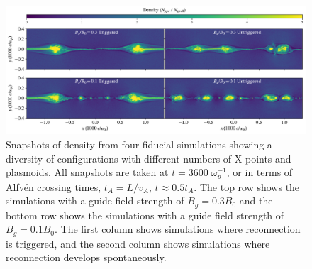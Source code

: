 \begin{figure}[t]
	\includegraphics[width=\linewidth]{2x2_flds_reord.pdf}
	\caption{Snapshots of density from four fiducial simulations showing a diversity of configurations with different numbers of X-points and plasmoids.  All snapshots are taken at $t=3600 \; \omega_{p}^{-1}$, or in terms of Alfv\'en crossing times, $t_{A}=L/v_{A}$, $t \approx 0.5 t_{A}$.  The top row shows the simulations with a guide field strength of $B_{g}=0.3B_{0}$ and the bottom row shows the simulations with a guide field strength of $B_{g}=0.1B_{0}$.  The first column shows simulations where reconnection is triggered, and the second column shows simulations where reconnection develops spontaneously.
	}
	\label{lowbeta_fourdens}
\end{figure}


